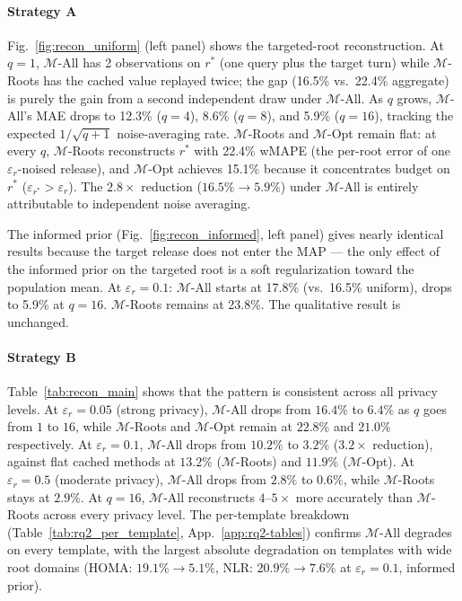 \paragraph{Strategy A}
Fig.~\ref{fig:recon_uniform} (left panel) shows the targeted-root reconstruction. At $q = 1$, $\mathcal{M}$-All has 2 observations on $r^*$ (one query plus the target turn) while $\mathcal{M}$-Roots has the cached value replayed twice; the gap (16.5\% vs.\ 22.4\% aggregate) is purely the gain from a second independent draw under $\mathcal{M}$-All. As $q$ grows, $\mathcal{M}$-All's MAE drops to 12.3\% ($q = 4$), 8.6\% ($q = 8$), and 5.9\% ($q = 16$), tracking the expected $1/\sqrt{q+1}$ noise-averaging rate. $\mathcal{M}$-Roots and $\mathcal{M}$-Opt remain flat: at every $q$, $\mathcal{M}$-Roots reconstructs $r^*$ with 22.4\% wMAPE (the per-root error of one $\varepsilon_r$-noised release), and $\mathcal{M}$-Opt achieves 15.1\% because it concentrates budget on $r^*$ ($\varepsilon_{r^*} > \varepsilon_r$). The $2.8\times$ reduction ($16.5\% \to 5.9\%$) under $\mathcal{M}$-All is entirely attributable to independent noise averaging.

The informed prior (Fig.~\ref{fig:recon_informed}, left panel) gives nearly identical results because the target release does not enter the MAP --- the only effect of the informed prior on the targeted root is a soft regularization toward the population mean. At $\varepsilon_r = 0.1$: $\mathcal{M}$-All starts at 17.8\% (vs.\ 16.5\% uniform), drops to 5.9\% at $q = 16$. $\mathcal{M}$-Roots remains at 23.8\%. The qualitative result is unchanged.

\paragraph{Strategy B}
Table~\ref{tab:recon_main} shows that the pattern is consistent across all privacy levels. At $\varepsilon_r = 0.05$ (strong privacy), $\mathcal{M}$-All drops from $16.4\%$ to $6.4\%$ as $q$ goes from $1$ to $16$, while $\mathcal{M}$-Roots and $\mathcal{M}$-Opt remain at $22.8\%$ and $21.0\%$ respectively. At $\varepsilon_r = 0.1$, $\mathcal{M}$-All drops from $10.2\%$ to $3.2\%$ ($3.2\times$ reduction), against flat cached methods at $13.2\%$ ($\mathcal{M}$-Roots) and $11.9\%$ ($\mathcal{M}$-Opt). At $\varepsilon_r = 0.5$ (moderate privacy), $\mathcal{M}$-All drops from $2.8\%$ to $0.6\%$, while $\mathcal{M}$-Roots stays at $2.9\%$. At $q = 16$, $\mathcal{M}$-All reconstructs $4$--$5\times$ more accurately than $\mathcal{M}$-Roots across every privacy level. The per-template breakdown (Table~\ref{tab:rq2_per_template}, App.~\ref{app:rq2-tables}) confirms $\mathcal{M}$-All degrades on every template, with the largest absolute degradation on templates with wide root domains (HOMA: $19.1\% \to 5.1\%$, NLR: $20.9\% \to 7.6\%$ at $\varepsilon_r = 0.1$, informed prior).

